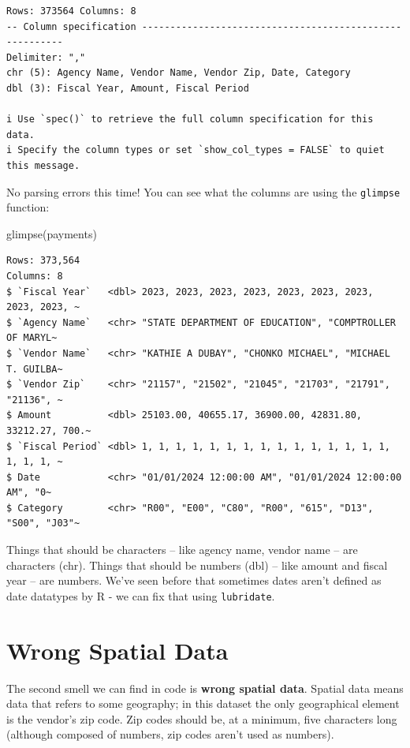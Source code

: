 \documentclass[
  letterpaper,
  DIV=11,
  numbers=noendperiod]{scrreprt}
\newenvironment{Shaded}{\begin{snugshade}}{\end{snugshade}}
\newcommand{\FunctionTok}[1]{\textcolor[rgb]{0.28,0.35,0.67}{#1}}
\newcommand{\NormalTok}[1]{\textcolor[rgb]{0.00,0.23,0.31}{#1}}
\begin{document}
\begin{verbatim}
Rows: 373564 Columns: 8
-- Column specification --------------------------------------------------------
Delimiter: ","
chr (5): Agency Name, Vendor Name, Vendor Zip, Date, Category
dbl (3): Fiscal Year, Amount, Fiscal Period

i Use `spec()` to retrieve the full column specification for this data.
i Specify the column types or set `show_col_types = FALSE` to quiet this message.
\end{verbatim}

No parsing errors this time! You can see what the columns are using the
\texttt{glimpse} function:

\begin{Shaded}
\begin{Highlighting}[]
\FunctionTok{glimpse}\NormalTok{(payments)}
\end{Highlighting}
\end{Shaded}

\begin{verbatim}
Rows: 373,564
Columns: 8
$ `Fiscal Year`   <dbl> 2023, 2023, 2023, 2023, 2023, 2023, 2023, 2023, 2023, ~
$ `Agency Name`   <chr> "STATE DEPARTMENT OF EDUCATION", "COMPTROLLER OF MARYL~
$ `Vendor Name`   <chr> "KATHIE A DUBAY", "CHONKO MICHAEL", "MICHAEL T. GUILBA~
$ `Vendor Zip`    <chr> "21157", "21502", "21045", "21703", "21791", "21136", ~
$ Amount          <dbl> 25103.00, 40655.17, 36900.00, 42831.80, 33212.27, 700.~
$ `Fiscal Period` <dbl> 1, 1, 1, 1, 1, 1, 1, 1, 1, 1, 1, 1, 1, 1, 1, 1, 1, 1, ~
$ Date            <chr> "01/01/2024 12:00:00 AM", "01/01/2024 12:00:00 AM", "0~
$ Category        <chr> "R00", "E00", "C80", "R00", "615", "D13", "S00", "J03"~
\end{verbatim}

Things that should be characters -- like agency name, vendor name -- are
characters (chr). Things that should be numbers (dbl) -- like amount and
fiscal year -- are numbers. We've seen before that sometimes dates
aren't defined as date datatypes by R - we can fix that using
\texttt{lubridate}.

\hypertarget{wrong-spatial-data}{%
\section{Wrong Spatial Data}\label{wrong-spatial-data}}

The second smell we can find in code is \textbf{wrong spatial data}.
Spatial data means data that refers to some geography; in this dataset
the only geographical element is the vendor's zip code. Zip codes should
be, at a minimum, five characters long (although composed of numbers,
zip codes aren't used as numbers).
\end{document}
